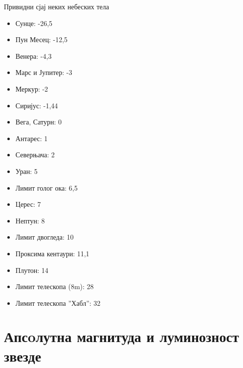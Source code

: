 \documentclass[aspectratio=169, xcolor=table, 10pt]{beamer}
\begin{document}
\begin{frame}{Привидни сјај неких небеских тела}
  \begin{multicols}{2}
    \begin{itemize}
      \item Сунце: -26,5
      \item Пун Месец: -12,5
      \item Венера: -4,3
      \item Марс и Јупитер: -3
      \item Меркур: -2
      \item Сиријус: -1,44
      \item Вега, Сатурн: 0
      \item Антарес: 1
      \item Северњача: 2
      \item Уран: 5
      \item Лимит голог ока: 6,5
      \item Церес: 7
      \item Нептун: 8
      \item Лимит двогледа: 10
      \item Проксима кентаури: 11,1
      \item Плутон: 14
      \item Лимит телескопа (8m): 28
      \item Лимит телескопа ”Хабл”: 32
    \end{itemize}
  \end{multicols}
\end{frame}

\section{Апсoлутна магнитуда и луминозност звезде}
\end{document}
